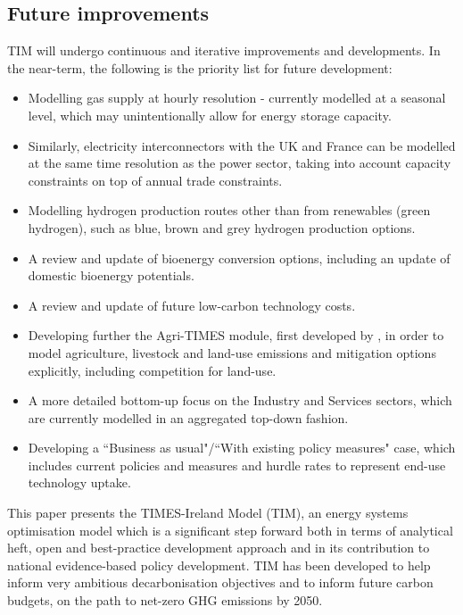 \documentclass[journal abbreviation, manuscript]{copernicus}
\begin{document}
\subsection{Future improvements}
TIM will undergo continuous and iterative improvements and developments. In the near-term, the following is the priority list for future development:
\begin{itemize}
 \item Modelling gas supply at hourly resolution - currently modelled at a seasonal level, which may unintentionally allow for energy storage capacity.
 \item Similarly, electricity interconnectors with the UK and France can be modelled at the same time resolution as the power sector, taking into account capacity constraints on top of annual trade constraints.
 \item Modelling hydrogen production routes other than from renewables (green hydrogen), such as blue, brown and grey hydrogen production options. 
 \item A review and update of bioenergy conversion options, including an update of domestic bioenergy potentials. 
 \item A review and update of future low-carbon technology costs.
 \item Developing further the Agri-TIMES module, first developed by \citet{Chiodi2016}, in order to model agriculture, livestock and land-use emissions and mitigation options explicitly, including competition for land-use.
 \item A more detailed bottom-up focus on the Industry and Services sectors, which are currently modelled in an aggregated top-down fashion. 
 \item Developing a ``Business as usual"/``With existing policy measures" case, which includes current policies and measures and hurdle rates to represent end-use technology uptake.
\end{itemize}


\conclusions  %
\label{s:conclusion}
This paper presents the TIMES-Ireland Model (TIM), an energy systems optimisation model which is a significant step forward both in terms of analytical heft, open and best-practice development approach and in its contribution to national evidence-based policy development. TIM has been developed to help inform very ambitious decarbonisation objectives and to inform future carbon budgets, on the path to net-zero GHG emissions by 2050. 
\end{document}
